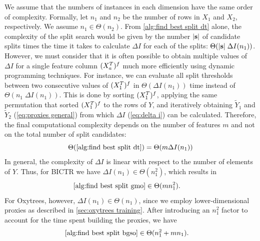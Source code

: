 \begin{appendices}
We assume that the numbers of instances in each dimension have the same order of complexity. Formally, let $n_1$ and $n_2$ be the number of rows in $X_1$ and $X_2$, respectively. We assume $n_1 \in \Theta(n_2)$.
%
From \ref{alg:find best split dt} alone, the complexity of the split search would be given by the number $|\mathbf{s}|$ of candidate splits times the time it takes to calculate $\Delta I$ for each of the splits: $\Theta(|\mathbf{s}| \;\Delta I(n_1))$. However, we must consider that it is often possible to obtain multiple values of $\Delta I$ for a single feature column $(X_a^T)^f$ much more efficiently using dynamic programming techniques. For instance, we can evaluate all split thresholds between two consecutive values of $(X_1^T)^f$ in $\Theta(\Delta I(n_1))$ time instead of $\Theta (n_1\;\Delta I (n_1))$. This is done by sorting $(X_1^T)^f$, applying the same permutation that sorted $(X_1^T)^f$ to the rows of $Y$, and iteratively obtaining $\tilde Y_1$ and $\tilde Y_2$ (\cref{eq:proxies general}) from which $\Delta I$ (\cref{eq:delta i}) can be calculated.
% 
Therefore, the final computational complexity depends on the number of features $m$
and not on the total number of split candidates:
\begin{equation}
    \Theta(\text{\ref{alg:find best split dt}}) = \Theta(m \Delta I (n_1))
\end{equation}
%
In general, the complexity of $\Delta I$ is linear with respect to the number of elements of $Y$. Thus, for BICTR we have $\Delta I(n_1) \in \Theta (n_1^2)$, which results in
%
\begin{align}
    \label{eq:complexity find split gmo}
    \text{\ref{alg:find best split gmo}}
        &\in \Theta(m n_1^2)
    \text{.}
\end{align}
For Oxytrees, however, $\Delta I(n_1) \in \Theta (n_1)$, since we employ lower-dimensional proxies as described in \cref{sec:oxytrees training}. After introducing an $n_1^2$ factor to account for the time spent building the proxies, we have
\begin{align}
    \label{eq:complexity find split bgso}
    \text{\ref{alg:find best split bgso}}
        &\in \Theta(n_1^2 + m n_1)
    \text{.}
\end{align}


\end{appendices}

